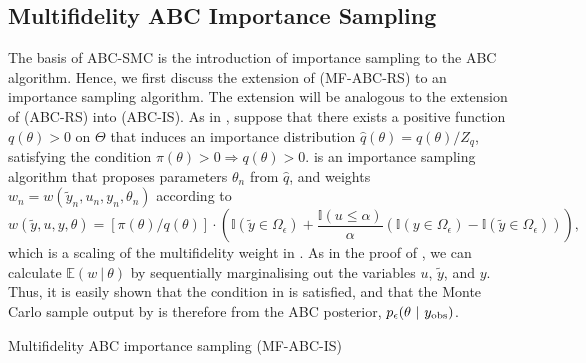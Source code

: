 \documentclass[review]{siamonline190516}
\begin{document}
\subsection{Multifidelity ABC Importance Sampling}
\label{s:MF-ABC-IS}

The basis of ABC-SMC is the introduction of importance sampling to the ABC algorithm.
Hence, we first discuss the extension of  (MF-ABC-RS) to an importance sampling algorithm.
The extension will be analogous to the extension of  (ABC-RS) into  (ABC-IS).
As in , suppose that there exists a positive function $q(\theta)>0$ on $\Theta$ that induces an importance distribution $\hat q(\theta) = q(\theta)/Z_q$, satisfying the condition $\pi(\theta)>0 \Rightarrow q(\theta)>0$.
 is an importance sampling algorithm that proposes parameters $\theta_n$ from $\hat q$, and weights $w_n = w(\tilde y_n, u_n, y_n, \theta_n)$ according to
\begin{equation}
\label{eq:qw_mf}
 w(\tilde y, u, y, \theta) 
 =
 \left[ \pi(\theta) \big/ q(\theta) \right] \cdot 
 \left( \mathbb I(\tilde y \in \Omega_\epsilon) + \frac{\mathbb I(u \leq \alpha)}{\alpha} \left( \mathbb I(y \in \Omega_\epsilon) - \mathbb I(\tilde y \in \Omega_\epsilon) \right) \right),
\end{equation}
which is a scaling of the multifidelity weight in .
As in the proof of , we can calculate $\mathbb E(w~|~\theta)$ by sequentially marginalising out the variables $u$, $\tilde y$, and $y$.
Thus, it is easily shown that the condition in  is satisfied, and that the Monte Carlo sample output by  is therefore from the ABC posterior, $p_\epsilon(\theta~|~y_{\mathrm{obs}})$.

\begin{algorithm}
\caption{Multifidelity ABC importance sampling (MF-ABC-IS)}
\label{MFABC:Importance}
\begin{algorithmic}[1]
\REPEAT{}
 \ENDIF{}
\end{algorithmic}
\end{algorithm}
\end{document}
